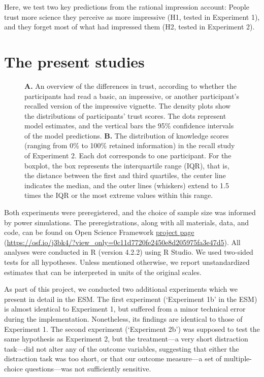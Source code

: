 \documentclass[
  english,
  doc,floatsintext]{apa6}
\makeatletter
\newcommand*\pandocbounded[1]{%
  \sbox\pandoc@box{#1}%
  \Gscale@div\@tempa{\textheight}{\dimexpr\ht\pandoc@box+\dp\pandoc@box\relax}%
  \Gscale@div\@tempb{\linewidth}{\wd\pandoc@box}%
  \ifdim\@tempb\p@<\@tempa\p@\let\@tempa\@tempb\fi%
  \ifdim\@tempa\p@<\p@\scalebox{\@tempa}{\usebox\pandoc@box}%
  \else\usebox{\pandoc@box}%
  \fi%
}
\makeatother
\begin{document}
Here, we test two key predictions from the rational impression account: People trust more science they perceive as more impressive (H1, tested in Experiment 1), and they forget most of what had impressed them (H2, tested in Experiment 2).

\section{The present studies}\label{the-present-studies}



\begin{figure}
\centering
\pandocbounded{\texttt{[image: output/figures/overview-plot.pdf]}}
\caption{\label{fig:overview-plot}\textbf{A.} An overview of the differences in trust, according to whether the participants had read a basic, an impressive, or another participant's recalled version of the impressive vignette. The density plots show the distributions of participants' trust scores. The dots represent model estimates, and the vertical bars the 95\% confidence intervals of the model predictions. \textbf{B.} The distribution of knowledge scores (ranging from 0\% to 100\% retained information) in the recall study of Experiment 2. Each dot corresponds to one participant. For the boxplot, the box represents the interquartile range (IQR), that is, the distance between the first and third quartiles, the center line indicates the median, and the outer lines (whiskers) extend to 1.5 times the IQR or the most extreme values within this range.}
\end{figure}

Both experiments were preregistered, and the choice of sample size was informed by power simulations. The preregistrations, along with all materials, data, and code, can be found on Open Science Framework \href{https://osf.io/j3bk4/?view_only=0c11d7720fe2450e8d205975fa3e47d5}{project page} (\url{https://osf.io/j3bk4/?view_only=0c11d7720fe2450e8d205975fa3e47d5}). All analyses were conducted in R (version 4.2.2) using R Studio. We used two-sided tests for all hypotheses. Unless mentioned otherwise, we report unstandardized estimates that can be interpreted in units of the original scales.

As part of this project, we conducted two additional experiments which we present in detail in the ESM. The first experiment (`Experiment 1b' in the ESM) is almost identical to Experiment 1, but suffered from a minor technical error during the implementation. Nonetheless, its findings are identical to those of Experiment 1. The second experiment (`Experiment 2b') was supposed to test the same hypothesis as Experiment 2, but the treatment---a very short distraction task---did not alter any of the outcome variables, suggesting that either the distraction task was too short, or that our outcome measure---a set of multiple-choice questions---was not sufficiently sensitive.
\end{document}
